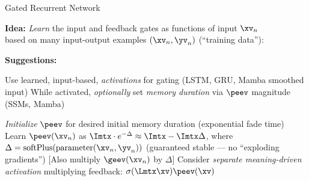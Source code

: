 \begin{slide}[\slideopts,toc={Gated RNN}]{Gated Recurrent Network}

\vspace{-1em}

  \textbf{Idea:} \emph{Learn} the input and feedback gates as functions of input $\xv_n$\\
  based on many input-output examples $(\xv_n,\yv_n)$ (``training data''):

\vspace{-1em}


\vspace{-1em}

\maybepause

\textbf{Suggestions:}
\begin{itemize}
\mpitem Use learned, input-based, \emph{activations} for gating (LSTM, GRU, Mamba smoothed input)
\mpitem While activated, \emph{optionally} set \emph{memory duration} via $\peev$ magnitude (SSMs, Mamba)
\begin{itemize}
  \mpitem \emph{Initialize} $\peev$ for desired initial memory duration (exponential fade time)
  \mpitem Learn $\peev(\xv_n)$ as $\Imtx\cdot e^{-\Delta}\approx \Imtx -\Imtx \Delta$,
  where $\Delta = \mbox{softPlus}(\mbox{parameter}(\xv_n,\yv_n))$ (guaranteed stable --- no ``exploding gradients'')
  [Also multiply $\geev(\xv_n)$ by $\Delta$] %
  \mpitem Consider \emph{separate meaning-driven activation} multiplying feedback: $\sigma(\Lmtx\xv)\peev(\xv)$
\end{itemize}
\end{itemize}

\end{slide}

